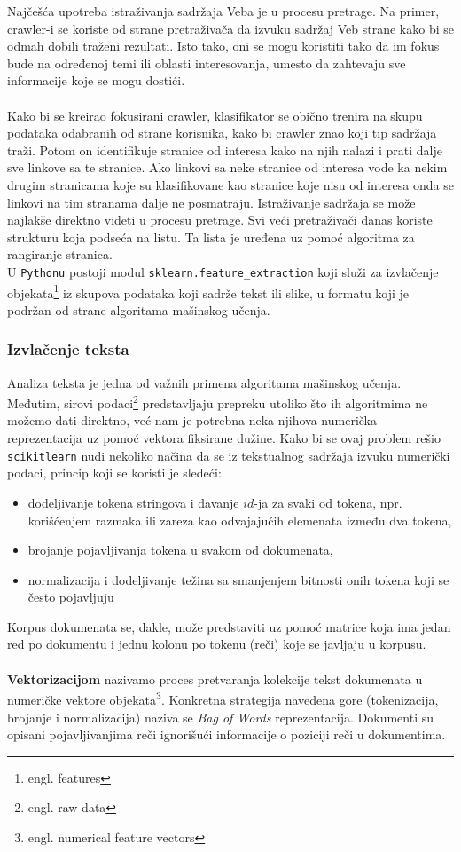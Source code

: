 \documentclass[a4paper]{article}
\begin{document}
Najčešća upotreba istraživanja sadržaja Veba je u procesu pretrage. Na primer, crawler-i se koriste od strane pretraživača da izvuku sadržaj Veb strane kako bi se odmah dobili traženi rezultati. Isto tako, oni se mogu koristiti tako da im fokus bude na određenoj temi ili oblasti interesovanja, umesto da zahtevaju sve informacije koje se mogu dostići.\\\\
Kako bi se kreirao fokusirani crawler, klasifikator se obično trenira na skupu podataka odabranih od strane korisnika, kako bi crawler znao koji tip sadržaja traži. Potom on identifikuje stranice od interesa kako na njih nalazi i prati dalje sve linkove sa te stranice. Ako linkovi sa neke stranice od interesa vode ka nekim drugim stranicama koje su klasifikovane kao stranice koje nisu od interesa onda se linkovi na tim stranama dalje ne posmatraju. Istraživanje sadržaja se može najlakše direktno videti u procesu pretrage. Svi veći pretraživači danas koriste strukturu koja podseća na listu. Ta lista je uređena uz pomoć algoritma za rangiranje stranica.\\

U \texttt{Pythonu} postoji modul \texttt{sklearn.feature\_extraction} koji služi za izvlačenje objekata\footnote{engl. features} iz skupova podataka koji sadrže tekst ili slike, u formatu koji je podržan od strane algoritama mašinskog učenja. 

\subsubsection{Izvlačenje teksta}

Analiza teksta je jedna od važnih primena algoritama mašinskog učenja. Međutim, sirovi podaci\footnote{engl. raw data} predstavljaju prepreku utoliko što ih algoritmima ne možemo dati direktno, već nam je potrebna neka njihova numerička reprezentacija uz pomoć vektora fiksirane dužine. Kako bi se ovaj problem rešio \texttt{scikit\-learn} nudi nekoliko načina da se iz tekstualnog sadržaja izvuku numerički podaci, princip koji se koristi je sledeći:
\begin{itemize}
\item dodeljivanje tokena stringova i davanje $id$-ja za svaki od tokena, npr. korišćenjem razmaka ili zareza kao odvajajućih elemenata između dva tokena,
\item brojanje pojavljivanja tokena u svakom od dokumenata,
\item normalizacija i dodeljivanje težina sa smanjenjem bitnosti onih tokena koji se često pojavljuju
\end{itemize}
Korpus dokumenata se, dakle, može predstaviti uz pomoć matrice koja ima jedan red po dokumentu i jednu kolonu po tokenu (reči) koje se javljaju u korpusu.\\\\
\textbf{Vektorizacijom} nazivamo proces pretvaranja kolekcije tekst dokumenata u numeričke vektore objekata\footnote{engl. numerical feature vectors}. Konkretna strategija navedena gore (tokenizacija, brojanje i normalizacija) naziva se \textit{Bag of Words} reprezentacija. Dokumenti su opisani pojavljivanjima reči ignorišući informacije o poziciji reči u dokumentima.\\
\end{document}

